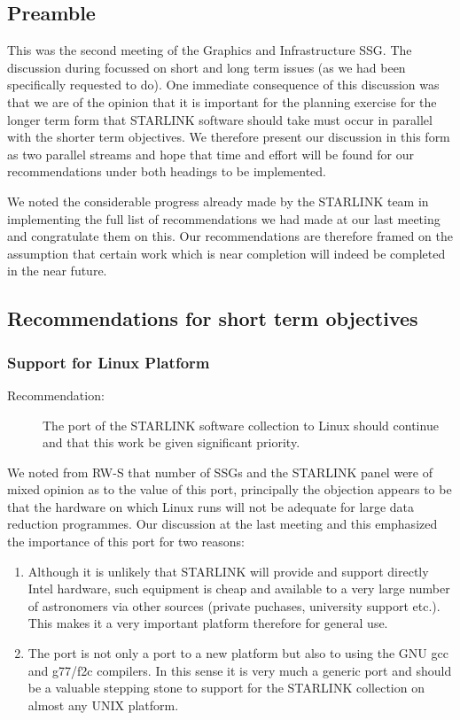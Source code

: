 \subsection{Preamble}

This was the second meeting of the Graphics and Infrastructure SSG.
The discussion during focussed on short and long term issues (as we
had been specifically requested to do).  One immediate consequence of
this discussion was that we are of the opinion that it is important
for the planning exercise for the longer term form that STARLINK
software should take must occur in parallel with the shorter term
objectives.  We therefore present our discussion in this form as two
parallel streams and hope that time and effort will be found for our
recommendations under both headings to be implemented.

We noted the considerable progress already made by the STARLINK team
in implementing the full list of recommendations we had made at our
last meeting and congratulate them on this.  Our recommendations are
therefore framed on the assumption that certain work which is near
completion will indeed be completed in the near future.

\subsection{Recommendations for short term objectives}

\subsubsection{Support for Linux Platform}

\begin{description}
\item[Recommendation:] The port of the STARLINK software collection to 
Linux should continue and that this work be given significant
priority.
\end{description}

We noted from RW-S that number of SSGs and the STARLINK panel were of
mixed opinion as to the value of this port, principally the objection
appears to be that the hardware on which Linux runs will not be
adequate for large data reduction programmes.  Our discussion at the
last meeting and this emphasized the importance of this port for two
reasons:

\begin{enumerate}
\item Although it is unlikely that STARLINK will provide and support
directly Intel hardware, such equipment is cheap and available to a
very large number of astronomers via other sources (private puchases,
university support etc.).  This makes it a very important platform
therefore for general use.

\item The port is not only a port to a new platform but also to using
the GNU gcc and g77/f2c compilers.  In this sense it is very much a
generic port and should be a valuable stepping stone to support for
the STARLINK collection on almost any UNIX platform.
\end{enumerate}

